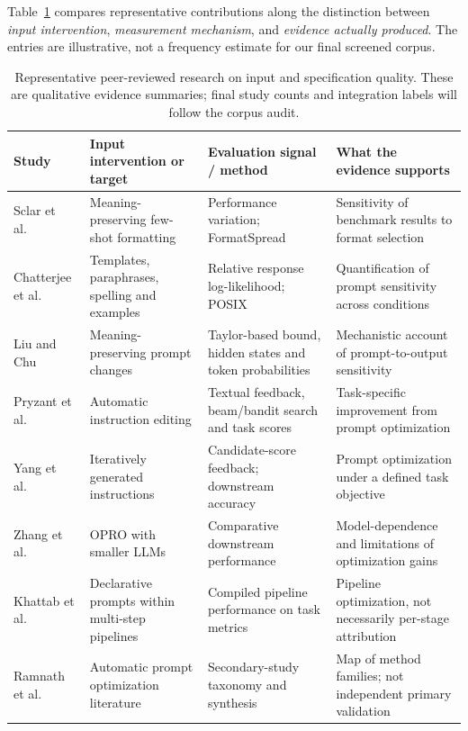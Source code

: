 Table~\ref{tab:input-quality-studies} compares representative contributions along the distinction between \emph{input intervention}, \emph{measurement mechanism}, and \emph{evidence actually produced}. The entries are illustrative, not a frequency estimate for our final screened corpus.

\begin{table}[t]
\centering
\footnotesize
\caption{Representative peer-reviewed research on input and specification quality. These are qualitative evidence summaries; final study counts and integration labels will follow the corpus audit.}
\label{tab:input-quality-studies}
\begin{tabular}{p{} p{} p{} p{}}
\toprule
\textbf{Study} & \textbf{Input intervention or target} & \textbf{Evaluation signal / method} & \textbf{What the evidence supports} \\
\midrule
Sclar et al.\ \cite{sclar2024formatting} & Meaning-preserving few-shot formatting & Performance variation; FormatSpread & Sensitivity of benchmark results to format selection \\
Chatterjee et al.\ \cite{chatterjee2024posix} & Templates, paraphrases, spelling and examples & Relative response log-likelihood; POSIX & Quantification of prompt sensitivity across conditions \\
Liu and Chu \cite{liu2026promptsensitivity} & Meaning-preserving prompt changes & Taylor-based bound, hidden states and token probabilities & Mechanistic account of prompt-to-output sensitivity \\
Pryzant et al.\ \cite{pryzant2023protegi} & Automatic instruction editing & Textual feedback, beam/bandit search and task scores & Task-specific improvement from prompt optimization \\
Yang et al.\ \cite{yang2024opro} & Iteratively generated instructions & Candidate-score feedback; downstream accuracy & Prompt optimization under a defined task objective \\
Zhang et al.\ \cite{zhang2024revisitingopro} & OPRO with smaller LLMs & Comparative downstream performance & Model-dependence and limitations of optimization gains \\
Khattab et al.\ \cite{khattab2024dspy} & Declarative prompts within multi-step pipelines & Compiled pipeline performance on task metrics & Pipeline optimization, not necessarily per-stage attribution \\
Ramnath et al.\ \cite{ramnath2025aposurvey} & Automatic prompt optimization literature & Secondary-study taxonomy and synthesis & Map of method families; not independent primary validation \\
\bottomrule
\end{tabular}
\end{table}

